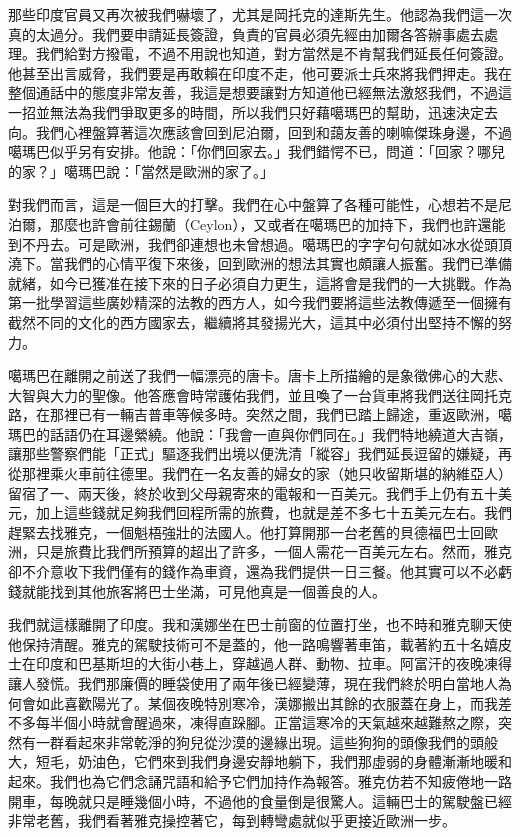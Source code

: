 那些印度官員又再次被我們嚇壞了，尤其是岡托克的達斯先生。他認為我們這一次真的太過分。我們要申請延長簽證，負責的官員必須先經由加爾各答辦事處去處理。我們給對方撥電，不過不用說也知道，對方當然是不肯幫我們延長任何簽證。他甚至出言威脅，我們要是再敢賴在印度不走，他可要派士兵來將我們押走。我在整個通話中的態度非常友善，我這是想要讓對方知道他已經無法激怒我們，不過這一招並無法為我們爭取更多的時間，所以我們只好藉噶瑪巴的幫助，迅速決定去向。我們心裡盤算著這次應該會回到尼泊爾，回到和藹友善的喇嘛傑珠身邊，不過噶瑪巴似乎另有安排。他說：「你們回家去。」我們錯愕不已，問道：「回家？哪兒的家？」噶瑪巴說：「當然是歐洲的家了。」

對我們而言，這是一個巨大的打擊。我們在心中盤算了各種可能性，心想若不是尼泊爾，那麼也許會前往錫蘭（Ceylon），又或者在噶瑪巴的加持下，我們也許還能到不丹去。可是歐洲，我們卻連想也未曾想過。噶瑪巴的字字句句就如冰水從頭頂澆下。當我們的心情平復下來後，回到歐洲的想法其實也頗讓人振奮。我們已準備就緒，如今已獲准在接下來的日子必須自力更生，這將會是我們的一大挑戰。作為第一批學習這些廣妙精深的法教的西方人，如今我們要將這些法教傳遞至一個擁有截然不同的文化的西方國家去，繼續將其發揚光大，這其中必須付出堅持不懈的努力。

噶瑪巴在離開之前送了我們一幅漂亮的唐卡。唐卡上所描繪的是象徵佛心的大悲、大智與大力的聖像。他答應會時常護佑我們，並且喚了一台貨車將我們送往岡托克路，在那裡已有一輛吉普車等候多時。突然之間，我們已踏上歸途，重返歐洲，噶瑪巴的話語仍在耳邊縈繞。他說：「我會一直與你們同在。」我們特地繞道大吉嶺，讓那些警察們能「正式」驅逐我們出境以便洗清「縱容」我們延長逗留的嫌疑，再從那裡乘火車前往德里。我們在一名友善的婦女的家（她只收留斯堪的納維亞人）留宿了一、兩天後，終於收到父母親寄來的電報和一百美元。我們手上仍有五十美元，加上這些錢就足夠我們回程所需的旅費，也就是差不多七十五美元左右。我們趕緊去找雅克，一個魁梧強壯的法國人。他打算開那一台老舊的貝德福巴士回歐洲，只是旅費比我們所預算的超出了許多，一個人需花一百美元左右。然而，雅克卻不介意收下我們僅有的錢作為車資，還為我們提供一日三餐。他其實可以不必虧錢就能找到其他旅客將巴士坐滿，可見他真是一個善良的人。

我們就這樣離開了印度。我和漢娜坐在巴士前窗的位置打坐，也不時和雅克聊天使他保持清醒。雅克的駕駛技術可不是蓋的，他一路鳴響著車笛，載著約五十名嬉皮士在印度和巴基斯坦的大街小巷上，穿越過人群、動物、拉車。阿富汗的夜晚凍得讓人發慌。我們那廉價的睡袋使用了兩年後已經變薄，現在我們終於明白當地人為何會如此喜歡陽光了。某個夜晚特別寒冷，漢娜搬出其餘的衣服蓋在身上，而我差不多每半個小時就會醒過來，凍得直跺腳。正當這寒冷的天氣越來越難熬之際，突然有一群看起來非常乾淨的狗兒從沙漠的邊緣出現。這些狗狗的頭像我們的頭般大，短毛，奶油色，它們來到我們身邊安靜地躺下，我們那虛弱的身體漸漸地暖和起來。我們也為它們念誦咒語和給予它們加持作為報答。雅克仿若不知疲倦地一路開車，每晚就只是睡幾個小時，不過他的食量倒是很驚人。這輛巴士的駕駛盤已經非常老舊，我們看著雅克操控著它，每到轉彎處就似乎更接近歐洲一步。

